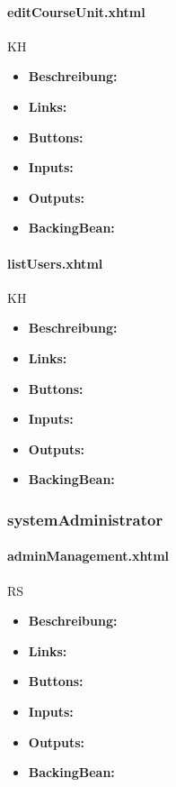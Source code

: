 				\paragraph{editCourseUnit.xhtml}
					KH\\
					\begin{itemize}
						\item \textbf{Beschreibung:}
						\item \textbf{Links:}
						\item \textbf{Buttons:}
						\item \textbf{Inputs:}
						\item \textbf{Outputs:}
						\item \textbf{BackingBean:}
					\end{itemize}
				
				\paragraph{listUsers.xhtml}
					KH\\
					\begin{itemize}
						\item \textbf{Beschreibung:}
						\item \textbf{Links:}
						\item \textbf{Buttons:}
						\item \textbf{Inputs:}
						\item \textbf{Outputs:}
						\item \textbf{BackingBean:}
					\end{itemize}
			
			\subsubsection{systemAdministrator}
			
				\paragraph{adminManagement.xhtml}
					RS\\
					\begin{itemize}
						\item \textbf{Beschreibung:}
						\item \textbf{Links:}
						\item \textbf{Buttons:}
						\item \textbf{Inputs:}
						\item \textbf{Outputs:}
						\item \textbf{BackingBean:}
					\end{itemize}
				
